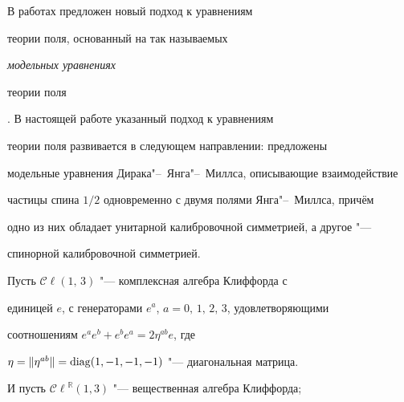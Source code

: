 











\date{20/XII/2010}




\maketitle



В работах \cite{marchuk11:1, marchuk11:2} предложен новый подход к уравнениям

теории поля,  основанный на так называемых {\em модельных уравнениях

теории поля}. В настоящей работе указанный подход к уравнениям

теории поля развивается в следующем направлении: предложены

модельные уравнения Дирака"--~Янга"--~Миллса,  описывающие взаимодействие

частицы спина $1/2$ одновременно с двумя полями Янга"--~Миллса,  причём

одно из них обладает унитарной калибровочной симметрией,  а другое "---

спинорной калибровочной симметрией.



Пусть ${\mathcal{C\!\ell}}(1, \,3)$ "--- комплексная алгебра Клиффорда \cite{marchuk11:1}  с

единицей $e$,  с генераторами $e^a$,  $a=0, \,1, \,2, \,3$,  удовлетворяющими

соотношениям $e^a e^b + e^b e^a=2 \eta^{ab}e$,  где

$\eta=\|\eta^{ab}\|={\rm diag}(1, -1, -1, -1)$ "--- диагональная матрица.

И пусть ${\mathcal{C\!\ell}}^{\mathbb R}(1, 3)$ "--- вещественная алгебра Клиффорда;

